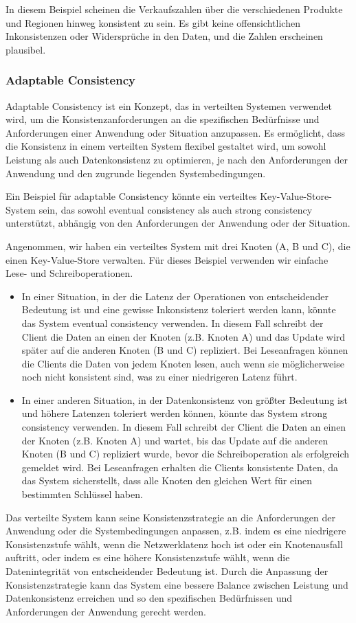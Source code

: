 \documentclass[../vs-script-first-v01.tex]{subfiles}
\begin{document}
In diesem Beispiel scheinen die Verkaufszahlen über die verschiedenen Produkte und Regionen hinweg konsistent zu sein. Es gibt keine offensichtlichen Inkonsistenzen oder Widersprüche in den Daten, und die Zahlen erscheinen plausibel. 

\subsubsection{Adaptable Consistency}

Adaptable Consistency ist ein Konzept, das in verteilten Systemen verwendet wird, um die Konsistenzanforderungen an die spezifischen Bedürfnisse und Anforderungen einer Anwendung oder Situation anzupassen. Es ermöglicht, dass die Konsistenz in einem verteilten System flexibel gestaltet wird, um sowohl Leistung als auch Datenkonsistenz zu optimieren, je nach den Anforderungen der Anwendung und den zugrunde liegenden Systembedingungen.

Ein  Beispiel für adaptable Consistency könnte ein verteiltes Key-Value-Store-System sein, das sowohl eventual consistency als auch strong consistency unterstützt, abhängig von den Anforderungen der Anwendung oder der Situation.

Angenommen, wir haben ein verteiltes System mit drei Knoten (A, B und C), die einen Key-Value-Store verwalten. Für dieses Beispiel verwenden wir einfache Lese- und Schreiboperationen.
\begin{itemize}
\item In einer Situation, in der die Latenz der Operationen von entscheidender Bedeutung ist und eine gewisse Inkonsistenz toleriert werden kann, könnte das System eventual consistency verwenden. In diesem Fall schreibt der Client die Daten an einen der Knoten (z.B. Knoten A) und das Update wird später auf die anderen Knoten (B und C) repliziert. Bei Leseanfragen können die Clients die Daten von jedem Knoten lesen, auch wenn sie möglicherweise noch nicht konsistent sind, was zu einer niedrigeren Latenz führt.
\item In einer anderen Situation, in der Datenkonsistenz von größter Bedeutung ist und höhere Latenzen toleriert werden können, könnte das System strong consistency verwenden. In diesem Fall schreibt der Client die Daten an einen der Knoten (z.B. Knoten A) und wartet, bis das Update auf die anderen Knoten (B und C) repliziert wurde, bevor die Schreiboperation als erfolgreich gemeldet wird. Bei Leseanfragen erhalten die Clients konsistente Daten, da das System sicherstellt, dass alle Knoten den gleichen Wert für einen bestimmten Schlüssel haben.
\end{itemize}
Das verteilte System kann seine Konsistenzstrategie an die Anforderungen der Anwendung oder die Systembedingungen anpassen, z.B. indem es eine niedrigere Konsistenzstufe wählt, wenn die Netzwerklatenz hoch ist oder ein Knotenausfall auftritt, oder indem es eine höhere Konsistenzstufe wählt, wenn die Datenintegrität von entscheidender Bedeutung ist. Durch die Anpassung der Konsistenzstrategie kann das System eine bessere Balance zwischen Leistung und Datenkonsistenz erreichen und so den spezifischen Bedürfnissen und Anforderungen der Anwendung gerecht werden.
\end{document}
